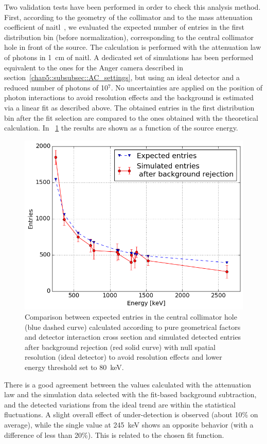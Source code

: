 Two validation tests have been performed in order to check this analysis method. 
First, according to the geometry of the collimator and to the mass attenuation coefficient of \gls{naitl}~\parencite{Hubbell1987}, we evaluated the expected number of entries in the first distribution bin (before normalization), corresponding to the central collimator hole in front of the source. The calculation is performed with the attenuation law of photons in 1~cm of \gls{naitl}. A dedicated set of simulations has been performed equivalent to the ones for the Anger camera described in section~\ref{chap5::subsubsec::AC_settings}, but using an ideal detector and a reduced number of photons of 10$^7$. No uncertainties are applied on the position of photon interactions to avoid resolution effects and the background is estimated via a linear fit as described above. The obtained entries in the first distribution bin after the fit selection are compared to the ones obtained with the theoretical calculation. In \figurename~\ref{chap5::fig::firstBinCheck} the results are shown as a function of the source energy.


\begin{figure}[h]
  \centering
  \includegraphics[width=.6\textwidth]{03_GraphicFiles/chapter5_SPECTsimu/SPECT/anger/firstBinInVSenergy}
\caption{Comparison between expected entries in the central collimator hole (blue dashed curve) calculated according to pure geometrical factors and detector interaction cross section and simulated detected entries after background rejection (red solid curve) with null spatial resolution (ideal detector) to avoid resolution effects and lower energy threshold set to 80~keV.}
\label{chap5::fig::firstBinCheck}
\end{figure}

There is a good agreement between the values calculated with the attenuation law and the simulation data selected with the fit-based background subtraction, and the detected variations from the ideal trend are within the statistical fluctuations. A slight overall effect of under-detection is observed (about 10\% on average), while the single value at 245~keV shows an opposite behavior (with a difference of less than 20\%). This is related to the chosen fit function.

